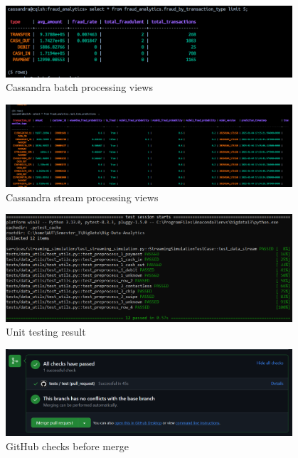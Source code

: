 \documentclass[12pt,a4paper, hidelinks]{article}
\begin{document}
\begin{figure}[h!]
  \centering
  \includegraphics[width=0.95\textwidth]{images/m3-cassandra-batch-3.png}
  \caption{Cassandra batch processing views}
  \label{fig:cassandra-batch-3}
\end{figure}

\begin{figure}[h!]
  \centering
  \includegraphics[width=0.95\textwidth]{images/m3-cassandra-streaming-processing.png}
  \caption{Cassandra stream processing views}
  \label{fig:cassandra-strean}
\end{figure}




\begin{figure}[h!]
  \centering
  \includegraphics[width=0.95\textwidth]{images/unittests-M2.png}
  \caption{Unit testing result}
  \label{fig:unittests}
\end{figure}



\begin{figure}[h!]
  \centering
  \includegraphics[width=0.95\textwidth]{images/github-checks-M2.PNG}
  \caption{GitHub checks before merge}
  \label{fig:github}
\end{figure}
\end{document}
